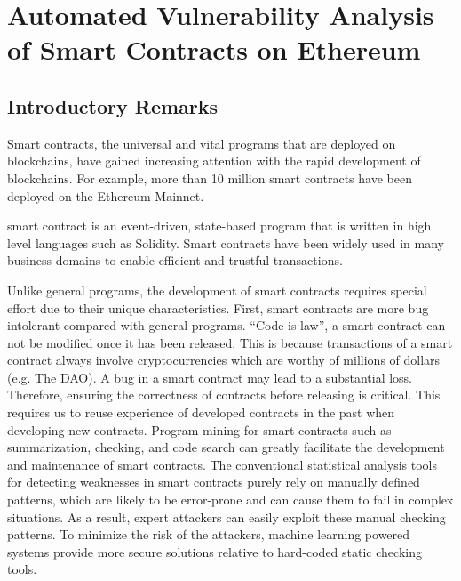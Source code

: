 \chapter{Automated Vulnerability Analysis of Smart Contracts on Ethereum} 
\label{ch:slither-simil}


\section{Introductory Remarks}
Smart contracts, the universal and vital programs that are deployed on blockchains, have gained increasing attention with the rapid development of blockchains.
For example, more than 10 million smart contracts have been deployed on the Ethereum Mainnet.

smart contract is an event-driven, state-based program that is written in high level languages such as Solidity.
Smart contracts have been widely used in many business domains to enable efficient and trustful transactions.

Unlike general programs, the development of smart contracts requires special effort due to their unique characteristics.
First, smart contracts are more bug intolerant compared with general programs.
“Code is law”, a smart contract can not be modified once it has been released. 
This is because transactions of a smart contract always involve cryptocurrencies which are worthy of millions of dollars (e.g. The DAO). 
A bug in a smart contract may lead to a substantial loss.
Therefore, ensuring the correctness of contracts before releasing is critical.
 This requires us to reuse experience of developed contracts in the past when developing new contracts.
Program mining for smart contracts such as summarization, checking, and code search can greatly facilitate the development and maintenance of smart contracts.
The conventional statistical analysis tools for detecting weaknesses in smart contracts purely rely on manually defined patterns, which are likely to be error-prone and can cause them to fail in complex situations.
As a result, expert attackers can easily exploit these manual checking patterns.
To minimize the risk of the attackers, machine learning powered systems provide more secure solutions relative to hard-coded static checking tools.

